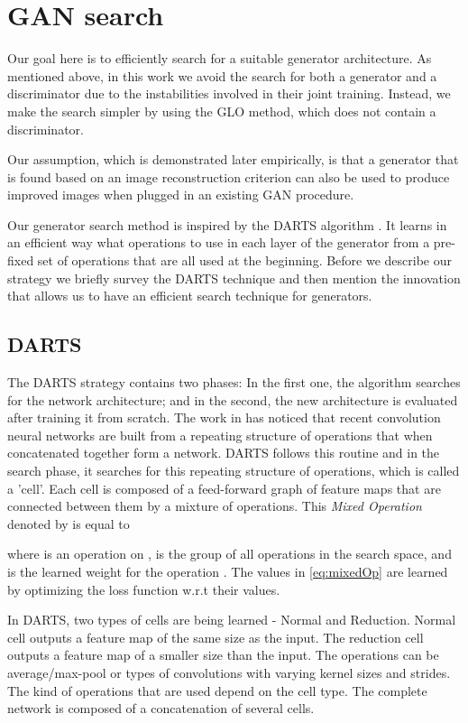\documentclass[10pt,twocolumn,letterpaper]{article}
\begin{document}
\section{GAN search}
\label{Method}
Our goal here is to efficiently search for a suitable generator architecture. As mentioned above, in this work we avoid the search for both a generator and a discriminator due to the instabilities involved in their joint training.  Instead, we make the search simpler by using the GLO method, which does not contain a discriminator. 

Our assumption, which is demonstrated later empirically, is that a generator that is found based on an image reconstruction criterion can also be used to produce improved images when plugged in an existing GAN procedure. 

Our generator search method is inspired by the DARTS algorithm \cite{liu19darts}. It learns in an efficient way what operations to use in each layer of the generator from a pre-fixed set of operations that are all used at the beginning. Before we describe our strategy we briefly survey the DARTS technique and then mention the innovation that allows us to have an efficient search technique for generators. 

\subsection{DARTS}
The DARTS strategy \cite{liu19darts} contains two phases: In the first one, the algorithm searches for the network architecture; and in the second, the new architecture is evaluated after training it from scratch.
The work in \cite{zophNasRL} has noticed that recent convolution neural networks are built from a repeating structure of operations that when concatenated together form a network. 
DARTS follows this routine and in the search phase, it searches for this repeating structure of operations, which is called a 'cell'.
Each cell is composed of a feed-forward graph of feature maps that are connected between them by a mixture of operations.
This \emph{Mixed Operation} denoted by  is equal to

where  is an operation on ,  is the group of all operations in the search space, and  is the learned weight for the operation .
The  values in \eqref{eq:mixedOp} are learned by optimizing the loss function w.r.t their values. 

In DARTS, two types of cells are being learned - Normal and Reduction.
Normal cell outputs a feature map of the same size as the input.
The reduction cell outputs a feature map of a smaller size than the input.
The operations  can be average/max-pool or types of convolutions with varying kernel sizes and strides. The kind of operations that are used depend on the cell type.
The complete network is composed of a concatenation of several cells.
\end{document}

